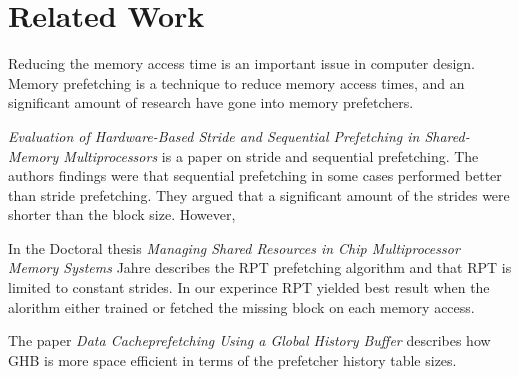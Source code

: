 \section{Related Work}
\label{sec:related-work}

Reducing the memory access time is an important issue in computer design.
Memory prefetching is a technique to reduce memory access times,
and an significant amount of research have gone into memory prefetchers.

\textit{Evaluation of Hardware-Based Stride and Sequential Prefetching in Shared-Memory Multiprocessors} \cite{bib:stride}
is a paper on stride and sequential prefetching.
The authors findings were that sequential prefetching in some cases performed better than stride prefetching.
They argued that a significant amount of the strides were shorter than the block size.
However, 

In the Doctoral thesis \textit{Managing Shared Resources in Chip Multiprocessor Memory Systems} \cite{bib:jahre}
Jahre describes the RPT prefetching algorithm and that RPT is limited to constant strides.
In our experince RPT yielded best result when the alorithm either trained or fetched the missing block on each memory access.

The paper \textit{Data Cacheprefetching Using a Global History Buffer} \cite{bib:ghb}
describes how GHB is more space efficient in terms of the prefetcher history table sizes.




